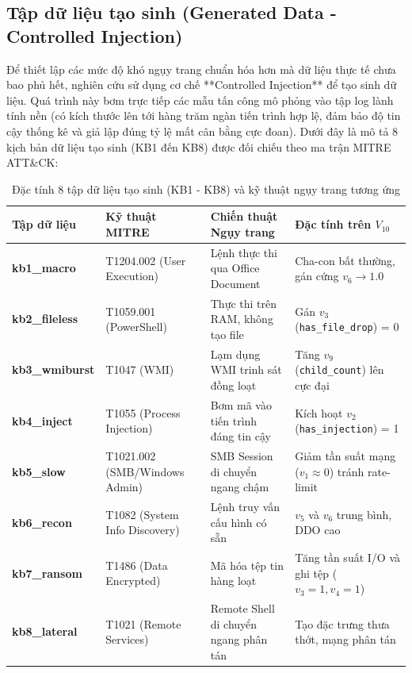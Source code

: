 \documentclass[../main.tex]{subfiles}
\begin{document}
\subsection{Tập dữ liệu tạo sinh (Generated Data - Controlled Injection)}
Để thiết lập các mức độ khó ngụy trang chuẩn hóa hơn mà dữ liệu thực tế chưa bao phủ hết, nghiên cứu sử dụng cơ chế **Controlled Injection** để tạo sinh dữ liệu. Quá trình này bơm trực tiếp các mẫu tấn công mô phỏng vào tập log lành tính nền (có kích thước lên tới hàng trăm ngàn tiến trình hợp lệ, đảm bảo độ tin cậy thống kê và giả lập đúng tỷ lệ mất cân bằng cực đoan). Dưới đây là mô tả 8 kịch bản dữ liệu tạo sinh (KB1 đến KB8) được đối chiếu theo ma trận MITRE ATT\&CK:
\begin{table}[H]
\centering
\small
\setlength{\tabcolsep}{4pt}
\caption{Đặc tính 8 tập dữ liệu tạo sinh (KB1 - KB8) và kỹ thuật ngụy trang tương ứng}
\label{tab:controlled_injection_scenarios}
\begin{tabular}{|p{2.8cm}|p{3.5cm}|p{3.0cm}|p{4.5cm}|}
\hline
\textbf{Tập dữ liệu} & \textbf{Kỹ thuật MITRE} & \textbf{Chiến thuật Ngụy trang} & \textbf{Đặc tính trên $V_{10}$} \\ \hline
\textbf{kb1\_macro} & T1204.002 (User Execution) & Lệnh thực thi qua Office Document & Cha-con bất thường, gán cứng $v_6 \to 1.0$ \\ \hline
\textbf{kb2\_fileless} & T1059.001 (PowerShell) & Thực thi trên RAM, không tạo file & Gán $v_3$ (\texttt{has\_file\_drop}) = 0 \\ \hline
\textbf{kb3\_wmiburst} & T1047 (WMI) & Lạm dụng WMI trinh sát đồng loạt & Tăng $v_9$ (\texttt{child\_count}) lên cực đại \\ \hline
\textbf{kb4\_inject} & T1055 (Process Injection) & Bơm mã vào tiến trình đáng tin cậy & Kích hoạt $v_2$ (\texttt{has\_injection}) = 1 \\ \hline
\textbf{kb5\_slow} & T1021.002 (SMB/Windows Admin) & SMB Session di chuyển ngang chậm & Giảm tần suất mạng ($v_1 \approx 0$) tránh rate-limit \\ \hline
\textbf{kb6\_recon} & T1082 (System Info Discovery) & Lệnh truy vấn cấu hình có sẵn & $v_5$ và $v_6$ trung bình, DDO cao \\ \hline
\textbf{kb7\_ransom} & T1486 (Data Encrypted) & Mã hóa tệp tin hàng loạt & Tăng tần suất I/O và ghi tệp ($v_3 = 1, v_4 = 1$) \\ \hline
\textbf{kb8\_lateral} & T1021 (Remote Services) & Remote Shell di chuyển ngang phân tán & Tạo đặc trưng thưa thớt, mạng phân tán \\ \hline
\end{tabular}
\end{table}
\end{document}
